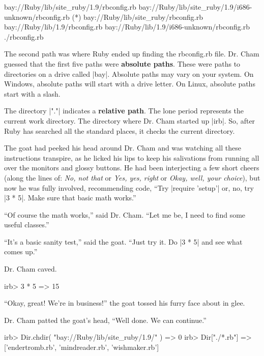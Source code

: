 \documentclass[12pt,twoside]{report}
\begin{document}
\begin{consolecode}

 bay://Ruby/lib/site_ruby/1.9/rbconfig.rb
 bay://Ruby/lib/site_ruby/1.9/i686-unknown/rbconfig.rb (*)
 bay://Ruby/lib/site_ruby/rbconfig.rb
 bay://Ruby/lib/1.9/rbconfig.rb
 bay://Ruby/lib/1.9/i686-unknown/rbconfig.rb
 ./rbconfig.rb

\end{consolecode}


The second path was where Ruby ended up finding the rbconfig.rb file.
Dr. Cham guessed that the first five paths were {\bf absolute paths}.
These were paths to directories on a drive called
\rubyinline|bay|.  Absolute paths may vary on your
system.  On Windows, absolute paths will start with a drive letter.
On Linux, absolute paths start with a slash.

The directory \rubyinline|"."| indicates a {\bf
  relative path}.  The lone period represents the current work
directory.  The directory where Dr. Cham started up
\rubyinline|irb|.  So, after Ruby has searched all the
standard places, it checks the current directory.

The goat had peeked his head around Dr. Cham and was watching all
these instructions transpire, as he licked his lips to keep his
salivations from running all over the monitors and glossy buttons.  He
had been interjecting a few short cheers (along the lines of: {\em No,
  not that} or {\em Yes, yes, right} or {\em Okay, well, your
  choice}), but now he was fully involved, recommending code, ``Try
\rubyinline|require 'setup'| or, no, try
\rubyinline|3 * 5|.  Make sure that basic math
works.''

``Of course the math works,'' said Dr. Cham.  ``Let me be, I need to
find some useful classes.''

``It's a basic sanity test,'' said the goat.  ``Just try it.  Do
\rubyinline|3 * 5| and see what comes up.''

Dr. Cham caved.


\begin{consolecode}

 irb> 3 * 5
   => 15

\end{consolecode}


``Okay, great!  We're in business!'' the goat tossed his furry face
about in glee.

Dr. Cham patted the goat's head, ``Well done.  We can continue.''


\begin{consolecode}

 irb> Dir.chdir( "bay://Ruby/lib/site_ruby/1.9/" )
   => 0
 irb> Dir["./*.{rb}"]
   => ['endertromb.rb', 'mindreader.rb', 'wishmaker.rb']

\end{consolecode}
\end{document}
